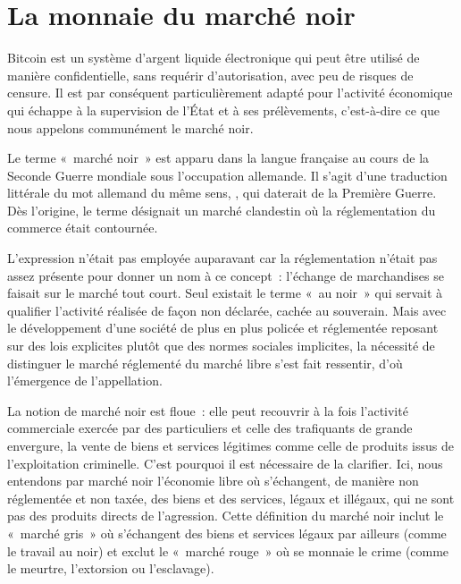 
\section*{La monnaie du marché noir}

Bitcoin est un système d'argent liquide électronique qui peut être utilisé de manière confidentielle, sans requérir d'autorisation, avec peu de risques de censure. Il est par conséquent particulièrement adapté pour l'activité économique qui échappe à la supervision de l'État et à ses prélèvements, c'est-à-dire ce que nous appelons communément le marché noir.


Le terme «~marché noir~» est apparu dans la langue française au cours de la Seconde Guerre mondiale sous l'occupation allemande. Il s'agit d'une traduction littérale du mot allemand du même sens, , qui daterait de la Première Guerre. Dès l'origine, le terme désignait un marché clandestin où la réglementation du commerce était contournée.

L'expression n'était pas employée auparavant car la réglementation n'était pas assez présente pour donner un nom à ce concept~: l'échange de marchandises se faisait sur le marché tout court. Seul existait le terme «~au noir~» qui servait à qualifier l'activité réalisée de façon non déclarée, cachée au souverain. Mais avec le développement d'une société de plus en plus policée et réglementée reposant sur des lois explicites plutôt que des normes sociales implicites, la nécessité de distinguer le marché réglementé du marché libre s'est fait ressentir, d'où l'émergence de l'appellation.

La notion de marché noir est floue~: elle peut recouvrir à la fois l'activité commerciale exercée par des particuliers et celle des trafiquants de grande envergure, la vente de biens et services légitimes comme celle de produits issus de l'exploitation criminelle. C'est pourquoi il est nécessaire de la clarifier. Ici, nous entendons par marché noir l'économie libre où s'échangent, de manière non réglementée et non taxée, des biens et des services, légaux et illégaux, qui ne sont pas des produits directs de l'agression. Cette définition du marché noir inclut le «~marché gris~» où s'échangent des biens et services légaux par ailleurs (comme le travail au noir) et exclut le «~marché rouge~» où se monnaie le crime (comme le meurtre, l'extorsion ou l'esclavage). %

